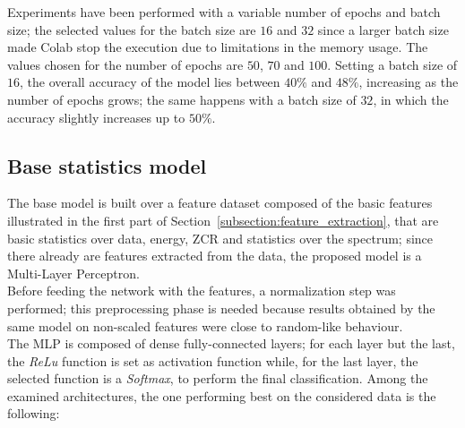 \documentclass[oneside,openany]{article}
\begin{document}
    Experiments have been performed with a variable number of epochs and batch size; the selected values for the batch size are $16$ and $32$ since a larger batch size made Colab stop the execution due to limitations in the memory usage. The values chosen for the number of epochs are $50$, $70$ and $100$.
    Setting a batch size of $16$, the overall accuracy of the model lies between $40\%$ and $48\%$, increasing as the number of epochs grows; the same happens with a batch size of $32$, in which the accuracy slightly increases up to $50\%$.
    
    \subsection{Base statistics model}
    \label{subsection:base_model}
    The base model is built over a feature dataset composed of the basic features illustrated in the first part of Section~\ref{subsection:feature_extraction}, that are basic statistics over data, energy, ZCR and statistics over the spectrum; since there already are features extracted from the data, the proposed model is a Multi-Layer Perceptron. \\
    Before feeding the network with the features, a normalization step was performed; this preprocessing phase is needed because results obtained by the same model on non-scaled features were close to random-like behaviour.\\
    The MLP is composed of dense fully-connected layers; for each layer but the last, the \textit{ReLu} function is set as activation function while, for the last layer, the selected function is a \textit{Softmax}, to perform the final classification. Among the examined architectures, the one performing best on the considered data is the following:
    
\end{document}
